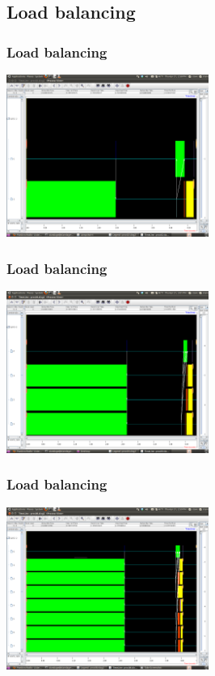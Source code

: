 \documentclass{beamer}
\begin{document}
\subsection{Load balancing}
\begin{frame}
  \frametitle{Load balancing}
  \begin{center}
    \includegraphics[height=200px]{procs-02.png}
  \end{center}
\end{frame}
\begin{frame}
  \frametitle{Load balancing}
  \begin{center}
    \includegraphics[height=200px]{procs-04.png}
  \end{center}
\end{frame}
\begin{frame}
  \frametitle{Load balancing}
  \begin{center}
    \includegraphics[height=200px]{procs-08.png}
  \end{center}
\end{frame}
\end{document}
